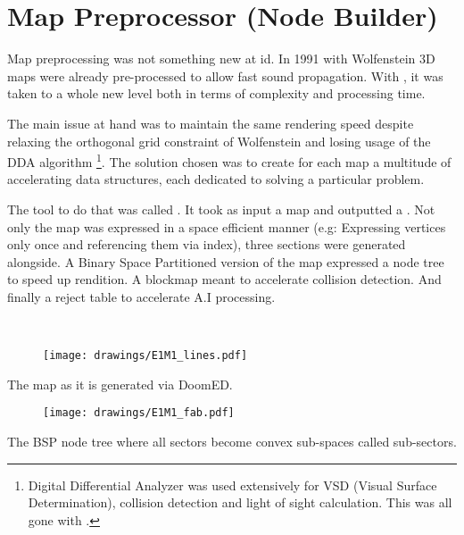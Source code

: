 \section{Map Preprocessor (Node Builder)}
Map preprocessing was not something new at id. In 1991 with Wolfenstein 3D maps were already pre-processed to allow fast sound propagation. With \doom, it was taken to a whole new level both in terms of complexity and processing time.\\
\par
The main issue at hand was to maintain the same rendering speed despite relaxing the orthogonal grid constraint of Wolfenstein and losing usage of the DDA algorithm \footnote{Digital Differential Analyzer was used extensively for VSD (Visual Surface Determination), collision detection and light of sight calculation. This was all gone with \doom.}. The solution chosen was to create for each map a multitude of accelerating data structures, each dedicated to solving a particular problem.\\
\par
 The tool to do that was called . It took as input a  map and outputted a . Not only the map was expressed in a space efficient manner (e.g: Expressing vertices only once and referencing them via index), three sections were generated alongside. A Binary Space Partitioned version of the map expressed a node tree to speed up rendition. A blockmap meant to accelerate collision detection. And finally a reject table to accelerate A.I processing.\\
 \par
{}\\%
\par
{}
\par


%
\begin{figure}[H]
\vspace*{3mm}
\centering
\texttt{[image: drawings/E1M1\_lines.pdf]}
\end{figure}
\par
The map as it is generated via DoomED.\\
\par
\begin{figure}[H]
\vspace*{2mm}
\centering
\texttt{[image: drawings/E1M1\_fab.pdf]}
\end{figure}
The BSP node tree where all sectors become convex sub-spaces called sub-sectors.



